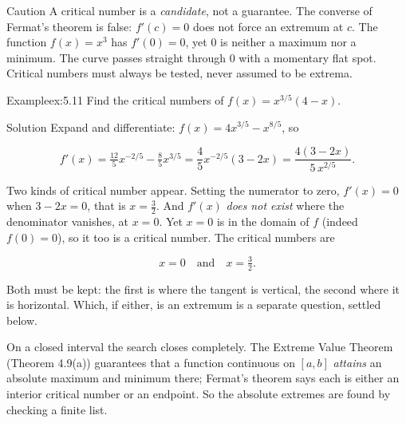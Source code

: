 \documentclass[a4paper,12pt,oneside]{memoir}
\begin{document}
\begin{envcaution}{Caution}{}{}
A critical number is a \emph{candidate}, not a guarantee. The converse of Fermat’s theorem is false: \(f'(c) = 0\) does not force an extremum at \(c\). The function \(f(x) = x^{3}\) has \(f'(0) = 0\), yet \(0\) is neither a maximum nor a minimum. The curve passes straight through \(0\) with a momentary flat spot. Critical numbers must always be tested, never assumed to be extrema.
\end{envcaution}
\begin{workedexample}
\begin{envexample}{Example}{ex:5.11}{}
Find the critical numbers of \(f(x) = x^{3/5}(4 - x)\).
\end{envexample}
\begin{envsolution}{Solution}{}{}
Expand and differentiate: \(f(x) = 4x^{3/5} - x^{8/5}\), so

\[ f'(x) = \tfrac{12}{5}x^{-2/5} - \tfrac{8}{5}x^{3/5} = \frac{4}{5}x^{-2/5}(3 - 2x) = \frac{4(3 - 2x)}{5\,x^{2/5}}. \]

Two kinds of critical number appear. Setting the numerator to zero, \(f'(x) = 0\) when \(3 - 2x = 0\), that is \(x = \tfrac{3}{2}\). And \(f'(x)\) \emph{does not exist} where the denominator vanishes, at \(x = 0\). Yet \(x = 0\) is in the domain of \(f\) (indeed \(f(0) = 0\)), so it too is a critical number. The critical numbers are

\[ x = 0 \quad\text{and}\quad x = \tfrac{3}{2}. \]

Both must be kept: the first is where the tangent is vertical, the second where it is horizontal. Which, if either, is an extremum is a separate question, settled below. \qedmark
\end{envsolution}
\end{workedexample}
On a closed interval the search closes completely. The Extreme Value Theorem (Theorem 4.9(a)) guarantees that a function continuous on \([a, b]\) \emph{attains} an absolute maximum and minimum there; Fermat’s theorem says each is either an interior critical number or an endpoint. So the absolute extremes are found by checking a finite list.
\end{document}
